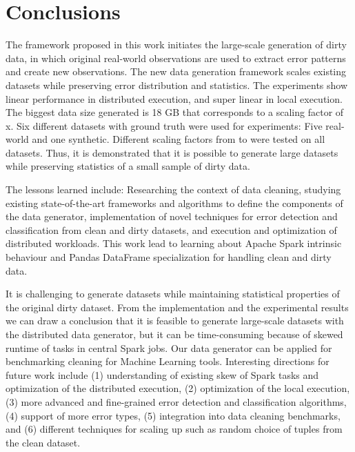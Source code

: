 \chapter{Conclusions}
The framework proposed in this work initiates the large-scale generation of dirty data, in which original real-world observations are used to extract error patterns and create new observations.
The new data generation framework scales existing datasets while preserving error distribution and statistics.
The experiments show linear performance in distributed execution, and super linear in local execution.
The biggest data size generated is 18 GB that corresponds to a scaling factor of x.
Six different datasets with ground truth were used for experiments: Five real-world and one synthetic.
Different scaling factors from  to  were tested on all datasets.
Thus, it is demonstrated that it is possible to generate large datasets while preserving statistics of a small sample of dirty data.

The lessons learned include: Researching the context of data cleaning, studying existing state-of-the-art frameworks and algorithms to define the components of the data generator, implementation of novel techniques for error detection and classification from clean and dirty datasets, and execution and optimization of distributed workloads.
This work lead to learning about Apache Spark intrinsic behaviour and Pandas DataFrame specialization for handling clean and  dirty data.

It is challenging to generate datasets while maintaining statistical properties of the original dirty dataset.
From the implementation and the experimental results we can draw a conclusion that it is feasible to generate large-scale datasets with the distributed data generator, but it can be time-consuming because of skewed runtime of tasks in central Spark jobs.
Our data generator can be applied for benchmarking cleaning for Machine Learning tools.
Interesting directions for future work include 
(1) understanding of existing skew of Spark tasks and optimization of the distributed execution,
(2) optimization of the local execution, 
(3) more advanced and fine-grained error detection and classification algorithms,
(4) support of more error types, 
(5) integration into data cleaning benchmarks, and
(6) different techniques for scaling up such as random choice of tuples from the clean dataset.
 

